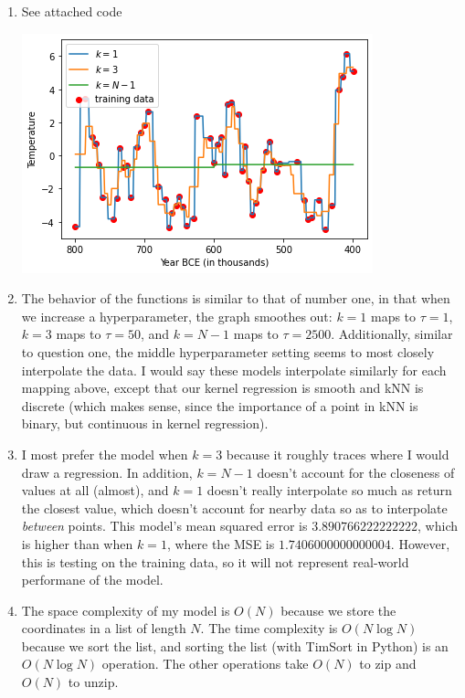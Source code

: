 \documentclass[submit]{harvardml}
\begin{document}
\newpage
\begin{enumerate}
    \item See attached code
        \newline
    \begin{center}
    \includegraphics[scale=0.7]{hw1/knn.png}
    \end{center}
\newline
    \item The behavior of the functions is similar to that of number one, in that when we increase a hyperparameter, the graph smoothes out: $k = 1$ maps to $\tau = 1$, $k = 3$ maps to $\tau = 50$, and $k = N - 1$ maps to $\tau = 2500$. Additionally, similar to question one, the middle hyperparameter setting seems to most closely interpolate the data. I would say these models interpolate similarly for each mapping above, except that our kernel regression is smooth and kNN is discrete (which makes sense, since the importance of a point in kNN is binary, but continuous in kernel regression). 
    \item I most prefer the model when $k = 3$ because it roughly traces where I would draw a regression. In addition, $k = N - 1$ doesn't account for the closeness of values at all (almost), and $k = 1$ doesn't really interpolate so much as return the closest value, which doesn't account for nearby data so as to interpolate \textit{between} points. This model's mean squared error is $3.890766222222222$, which is higher than when $k = 1$, where the MSE is $1.7406000000000004$. However, this is testing on the training data, so it will not represent real-world performane of the model. 
    \item The space complexity of my model is $O(N)$ because we store the coordinates in a list of length $N$. The time complexity is $O(N\log N)$ because we sort the list, and sorting the list (with TimSort in Python) is an $O(N\log N)$ operation. The other operations take $O(N)$ to zip and $O(N)$ to unzip. 
\end{enumerate}
\end{document}
